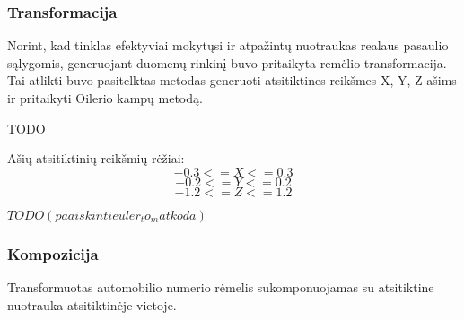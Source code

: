 \documentclass{VUMIFPSkursinis}
\begin{document}
\subsubsection{Transformacija}
Norint, kad tinklas efektyviai mokytųsi ir atpažintų nuotraukas realaus pasaulio sąlygomis, generuojant duomenų
rinkinį buvo pritaikyta remėlio transformacija. Tai atlikti buvo pasitelktas metodas generuoti atsitiktines
reikšmes X, Y, Z ašims ir pritaikyti Oilerio kampų metodą. \cite{slabaugh1999computing}

TODO

Ašių atsitiktinių reikšmių rėžiai:
\begin{equation}
  -0.3 <= X <= 0.3
\end{equation}
\begin{equation}
  -0.2 <= Y <= 0.2
\end{equation}
\begin{equation}
  -1.2 <= Z <= 1.2
\end{equation}

$TODO (paaiskinti euler_to_mat koda)$

\subsubsection{Kompozicija}
Transformuotas automobilio numerio rėmelis sukomponuojamas su atsitiktine nuotrauka atsitiktinėje vietoje.
\end{document}
